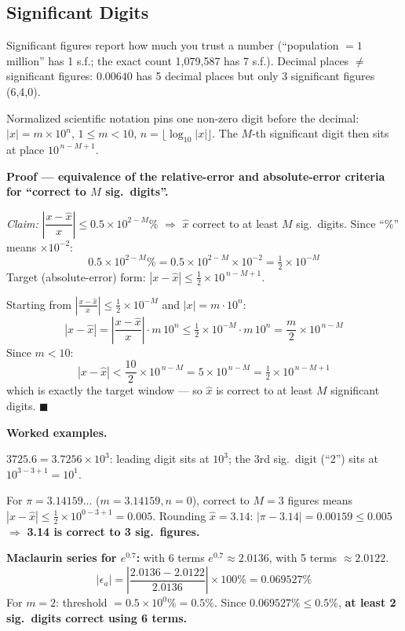 \subsection{Significant Digits}

\begin{defbox}
Significant figures report how much you trust a number (``population $=1$ million'' has 1 s.f.; the exact count 1{,}079{,}587 has 7 s.f.). Decimal places $\ne$ significant figures: $0.00640$ has 5 decimal places but only 3 significant figures (6,4,0).
\end{defbox}

Normalized scientific notation pins one non-zero digit before the decimal: $|x|=m\times10^n$, $1\le m<10$, $n=\lfloor\log_{10}|x|\rfloor$. The $M$-th significant digit then sits at place $10^{\,n-M+1}$.

\begin{examplebox}
\textbf{Proof — equivalence of the relative-error and absolute-error criteria for ``correct to $M$ sig.\ digits''.}

\emph{Claim:} $\left|\dfrac{x-\hat x}{x}\right|\le 0.5\times10^{2-M}\%$ $\Rightarrow$ $\hat x$ correct to at least $M$ sig.\ digits. Since ``\%'' means $\times10^{-2}$:
\[
0.5\times10^{2-M}\% = 0.5\times10^{2-M}\times10^{-2} = \tfrac12\times10^{-M}
\]
Target (absolute-error) form: $|x-\hat x|\le \tfrac12\times10^{\,n-M+1}$.

Starting from $\left|\frac{x-\hat x}{x}\right|\le \tfrac12\times10^{-M}$ and $|x|=m\cdot10^n$:
\[
|x-\hat x| = \left|\frac{x-\hat x}{x}\right|\cdot m\,10^n \le \tfrac12\times10^{-M}\cdot m\,10^n = \frac{m}{2}\times10^{\,n-M}
\]
Since $m<10$:
\[
|x-\hat x| < \frac{10}{2}\times10^{\,n-M} = 5\times10^{\,n-M} = \tfrac12\times10^{\,n-M+1}
\]
which is exactly the target window — so $\hat x$ is correct to at least $M$ significant digits. $\blacksquare$
\end{examplebox}

\begin{examplebox}
\textbf{Worked examples.}

$3725.6 = 3.7256\times10^3$: leading digit sits at $10^3$; the 3rd sig.\ digit (``2'') sits at $10^{3-3+1}=10^1$.

For $\pi=3.14159\ldots$ ($m=3.14159,n=0$), correct to $M=3$ figures means $|x-\hat x|\le\tfrac12\times10^{0-3+1}=0.005$. Rounding $\hat x=3.14$: $|\pi-3.14|=0.00159\le0.005$ $\Rightarrow$ \textbf{3.14 is correct to 3 sig.\ figures.}

\textbf{Maclaurin series for $e^{0.7}$:} with 6 terms $e^{0.7}\approx2.0136$, with 5 terms $\approx2.0122$.
\[
|\epsilon_a| = \left|\frac{2.0136-2.0122}{2.0136}\right|\times100\%=0.069527\%
\]
For $m=2$: threshold $=0.5\times10^0\%=0.5\%$. Since $0.069527\%\le0.5\%$, \textbf{at least 2 sig.\ digits correct using 6 terms.}
\end{examplebox}

